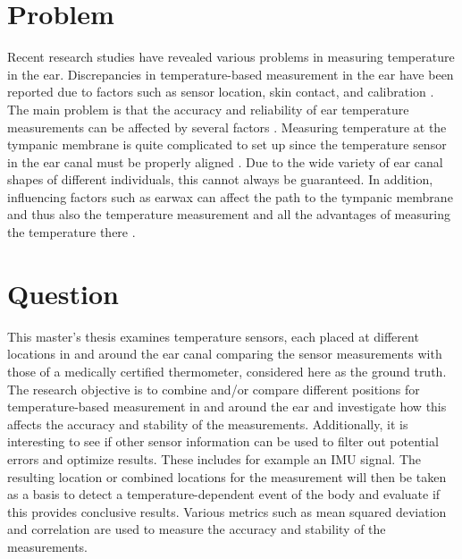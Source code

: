 \section{Problem}
\label{ch:Introduction:Problem}
Recent research studies have revealed various problems in measuring temperature in the ear.
Discrepancies in temperature-based measurement in the ear have been reported due to factors such as sensor location, skin contact, and calibration \cite{rohrbergTemperatureMeasurementEar1997, gasimAccuracyTympanicTemperature2013, amoateng-adjepongAccuracyInfraredTympanic1999a, hookerScreeningFeverAdult1996a, cattaneoAccuracyPrecisionBody2000}.
The main problem is that the accuracy and reliability of ear temperature measurements can be affected by several factors \cite{gasimAccuracyTympanicTemperature2013}. 
Measuring temperature at the tympanic membrane is quite complicated to set up since the temperature sensor in the ear canal must be properly aligned \cite{amoateng-adjepongAccuracyInfraredTympanic1999a, gasimAccuracyTympanicTemperature2013}. 
Due to the wide variety of ear canal shapes of different individuals, this cannot always be guaranteed.
In addition, influencing factors such as earwax can affect the path to the tympanic membrane and thus also the temperature measurement and all the advantages of measuring the temperature there \cite{gasimAccuracyTympanicTemperature2013}.


\section{Question}
\label{ch:Introduction:Question}
This master's thesis examines temperature sensors, each placed at different locations in and around the ear canal comparing the sensor measurements with those of a medically certified thermometer, considered here as the ground truth.
The research objective is to combine and/or compare different positions for temperature-based measurement in and around the ear and investigate how this affects the accuracy and stability of the measurements.
Additionally, it is interesting to see if other sensor information can be used to filter out potential errors and optimize results. These includes for example an IMU signal. The resulting location or combined locations for the measurement will then be taken as a basis to detect a temperature-dependent event of the body and evaluate if this provides conclusive results.
Various metrics such as mean squared deviation and correlation are used to measure the accuracy and stability of the measurements.

